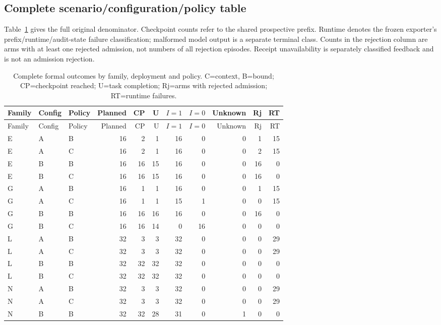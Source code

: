 \documentclass[11pt,a4paper]{article}
\begin{document}
\subsection{Complete scenario/configuration/policy table}
Table~\ref{tab:full-online} gives the full original denominator. Checkpoint counts refer to the shared prospective prefix. Runtime denotes the frozen exporter's prefix/runtime/audit-state failure classification; malformed model output is a separate terminal class. Counts in the rejection column are arms with at least one rejected admission, not numbers of all rejection episodes. Receipt unavailability is separately classified feedback and is not an admission rejection.
\begin{longtable}{@{}lllrrrrrrrr@{}}
\caption{Complete formal outcomes by family, deployment and policy. C=context, B=bound; CP=checkpoint reached; U=task completion; Rj=arms with rejected admission; RT=runtime failures.}\label{tab:full-online}\\
\toprule
Family & Config & Policy & Planned & CP & U & $I=1$ & $I=0$ & Unknown & Rj & RT\\
\midrule\endfirsthead
\toprule Family & Config & Policy & Planned & CP & U & $I=1$ & $I=0$ & Unknown & Rj & RT\\\midrule\endhead
E & A & B & 16 & 2 & 1 & 16 & 0 & 0 & 1 & 15 \\
E & A & C & 16 & 2 & 1 & 16 & 0 & 0 & 2 & 15 \\
E & B & B & 16 & 16 & 15 & 16 & 0 & 0 & 16 & 0 \\
E & B & C & 16 & 16 & 15 & 16 & 0 & 0 & 16 & 0 \\
G & A & B & 16 & 1 & 1 & 16 & 0 & 0 & 1 & 15 \\
G & A & C & 16 & 1 & 1 & 15 & 1 & 0 & 0 & 15 \\
G & B & B & 16 & 16 & 16 & 16 & 0 & 0 & 16 & 0 \\
G & B & C & 16 & 16 & 14 & 0 & 16 & 0 & 0 & 0 \\
L & A & B & 32 & 3 & 3 & 32 & 0 & 0 & 0 & 29 \\
L & A & C & 32 & 3 & 3 & 32 & 0 & 0 & 0 & 29 \\
L & B & B & 32 & 32 & 32 & 32 & 0 & 0 & 0 & 0 \\
L & B & C & 32 & 32 & 32 & 32 & 0 & 0 & 0 & 0 \\
N & A & B & 32 & 3 & 3 & 32 & 0 & 0 & 0 & 29 \\
N & A & C & 32 & 3 & 3 & 32 & 0 & 0 & 0 & 29 \\
N & B & B & 32 & 32 & 28 & 31 & 0 & 1 & 0 & 0 \\

\end{longtable}
\end{document}
